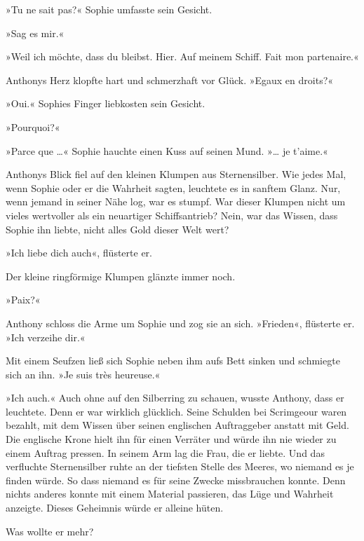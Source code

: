 »Tu ne sait pas?« Sophie umfasste sein Gesicht.

»Sag es mir.«

»Weil ich möchte, dass du bleibst. Hier. Auf meinem Schiff. Fait
mon partenaire.«

Anthonys Herz klopfte hart und schmerzhaft vor Glück. »Egaux en
droits?«

»Oui.« Sophies Finger liebkosten sein Gesicht.

»Pourquoi?«

»Parce que …« Sophie hauchte einen Kuss auf seinen Mund. »… je
t'aime.«

Anthonys Blick fiel auf den kleinen Klumpen aus Sternensilber. Wie
jedes Mal, wenn Sophie oder er die Wahrheit sagten, leuchtete es in
sanftem Glanz. Nur, wenn jemand in seiner Nähe log, war es stumpf.
War dieser Klumpen nicht um vieles wertvoller als ein neuartiger
Schiffsantrieb? Nein, war das Wissen, dass Sophie ihn liebte, nicht
alles Gold dieser Welt wert?

»Ich liebe dich auch«, flüsterte er.

Der kleine ringförmige Klumpen glänzte immer noch.

»Paix?«

Anthony schloss die Arme um Sophie und zog sie an sich. »Frieden«,
flüsterte er. »Ich verzeihe dir.«

Mit einem Seufzen ließ sich Sophie neben ihm aufs Bett sinken und
schmiegte sich an ihn. »Je suis très heureuse.«

»Ich auch.« Auch ohne auf den Silberring zu schauen, wusste
Anthony, dass er leuchtete. Denn er war wirklich glücklich. Seine
Schulden bei Scrimgeour waren bezahlt, mit dem Wissen über seinen
englischen Auftraggeber anstatt mit Geld. Die englische Krone hielt
ihn für einen Verräter und würde ihn nie wieder zu einem Auftrag
pressen. In seinem Arm lag die Frau, die er liebte. Und das
verfluchte Sternensilber ruhte an der tiefsten Stelle des Meeres,
wo niemand es je finden würde. So dass niemand es für seine Zwecke
missbrauchen konnte. Denn nichts anderes konnte mit einem Material
passieren, das Lüge und Wahrheit anzeigte. Dieses Geheimnis würde
er alleine hüten.

Was wollte er mehr?

